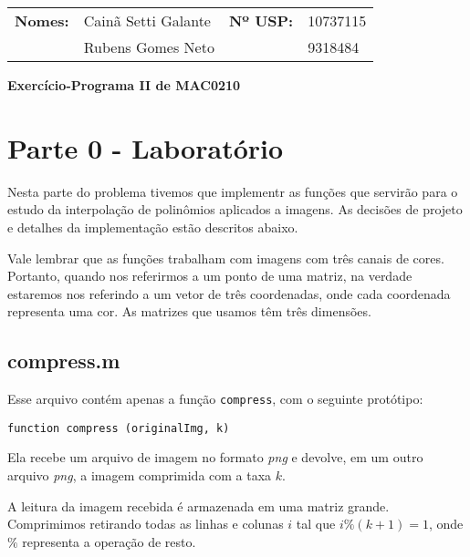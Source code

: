 \documentclass[12pt,letterpaper]{article}
\begin{document}
    \begin{table}[]
        \centering
        \label{my-label}
        \begin{tabular}{llll}
            \textbf{Nomes:}&Cainã Setti Galante &   \textbf{Nº USP:} & 10737115 \\
            & Rubens Gomes Neto &         &  9318484 \\
        \end{tabular}
    \end{table}

    \begin{center}
        \huge \bf
        Exercício-Programa II de MAC0210 \\
    \end{center}

    \section{Parte 0 - Laboratório}

        Nesta parte do problema tivemos que implementr as funções que servirão para o estudo da interpolação de polinômios aplicados a imagens. As decisões de projeto e detalhes da implementação estão descritos abaixo.

        Vale lembrar que as funções trabalham com imagens com três canais de cores. Portanto, quando nos referirmos a um ponto de uma matriz, na verdade estaremos nos referindo a um vetor de três coordenadas, onde cada coordenada representa uma cor. As matrizes que usamos têm três dimensões.

        \subsection{compress.m}

        Esse arquivo contém apenas a função \texttt{compress}, com o seguinte protótipo:

        \begin{center}
            \texttt{function compress (originalImg, k)}
        \end{center}

        Ela recebe um arquivo de imagem no formato \textit{png} e devolve, em um outro arquivo \textit{png}, a imagem comprimida com a taxa $k$.

        A leitura da imagem recebida é armazenada em uma matriz grande. Comprimimos retirando todas as linhas e colunas $i$ tal que $i\%(k+1)=1$, onde $\%$ representa a operação de resto.
\end{document}

